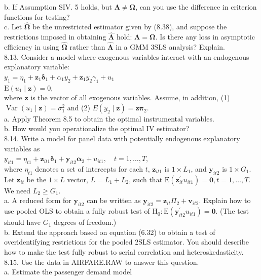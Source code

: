 \documentclass[10pt]{article}
\begin{document}
b. If Assumption SIV. 5 holds, but $\boldsymbol{\Lambda} \neq \boldsymbol{\Omega}$, can you use the difference in criterion functions for testing?\\
c. Let $\hat{\boldsymbol{\Omega}}$ be the unrestricted estimator given by (8.38), and suppose the restrictions imposed in obtaining $\hat{\boldsymbol{\Lambda}}$ hold: $\boldsymbol{\Lambda}=\boldsymbol{\Omega}$. Is there any loss in asymptotic efficiency in using $\hat{\boldsymbol{\Omega}}$ rather than $\hat{\boldsymbol{\Lambda}}$ in a GMM 3SLS analysis? Explain.\\
8.13. Consider a model where exogenous variables interact with an endogenous explanatory variable:\\
$y_{1}=\eta_{1}+\mathbf{z}_{1} \boldsymbol{\delta}_{1}+\alpha_{1} y_{2}+\mathbf{z}_{1} y_{2} \gamma_{1}+u_{1}$\\
$\mathrm{E}\left(u_{1} \mid \mathbf{z}\right)=0$,\\
where $\mathbf{z}$ is the vector of all exogenous variables. Assume, in addition, (1) $\operatorname{Var}\left(u_{1} \mid \mathbf{z}\right)=\sigma_{1}^{2}$ and (2) $E\left(y_{2} \mid \mathbf{z}\right)=\mathbf{z} \boldsymbol{\pi}_{2}$.\\
a. Apply Theorem 8.5 to obtain the optimal instrumental variables.\\
b. How would you operationalize the optimal IV estimator?\\
8.14. Write a model for panel data with potentially endogenous explanatory variables as\\
$y_{i t 1}=\eta_{t 1}+\mathbf{z}_{i t 1} \boldsymbol{\delta}_{1}+\mathbf{y}_{i t 2} \boldsymbol{\alpha}_{2}+u_{i t 1}, \quad t=1, \ldots, T$,\\
where $\eta_{t 1}$ denotes a set of intercepts for each $t$, $\mathbf{z}_{i t 1}$ is $1 \times L_{1}$, and $\mathbf{y}_{i t 2}$ is $1 \times G_{1}$. Let $\mathbf{z}_{i t}$ be the $1 \times L$ vector, $L=L_{1}+L_{2}$, such that $\mathrm{E}\left(\mathbf{z}_{i t}^{\prime} u_{i t 1}\right)=\mathbf{0}, t=1, \ldots, T$. We need $L_{2} \geq G_{1}$.\\
a. A reduced form for $\mathbf{y}_{i t 2}$ can be written as $\mathbf{y}_{i t 2}=\mathbf{z}_{i t} \Pi_{2}+\mathbf{v}_{i t 2}$. Explain how to use pooled OLS to obtain a fully robust test of $\mathrm{H}_{0}: \mathrm{E}\left(\mathbf{y}_{i t 2}^{\prime} u_{i t 1}\right)=\mathbf{0}$. (The test should have $G_{1}$ degrees of freedom.)\\
b. Extend the approach based on equation (6.32) to obtain a test of overidentifying restrictions for the pooled 2SLS estimator. You should describe how to make the test fully robust to serial correlation and heteroskedasticity.\\
8.15. Use the data in AIRFARE.RAW to answer this question.\\
a. Estimate the passenger demand model
\end{document}
